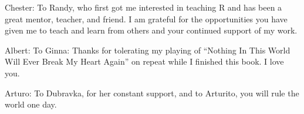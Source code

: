 \cleardoublepage\newpage
\thispagestyle{empty}

\vspace*{2in}

\begin{center}
Chester: To Randy, who first got me interested in teaching R and has been a great mentor, teacher, and friend. I am grateful for the opportunities you have given me to teach and learn from others and your continued support of my work.

\vspace{0.3in}

Albert:  \selectfont To Ginna: Thanks for tolerating my playing of ``Nothing In This World Will Ever Break My Heart Again'' on repeat while I finished this book. I love you.

\vspace{0.3in}

Arturo: To Dubravka, for her constant support, and to Arturito, you will rule the world one day.


\end{center}

\setlength{\abovedisplayskip}{-5pt}
\setlength{\abovedisplayshortskip}{-5pt}
